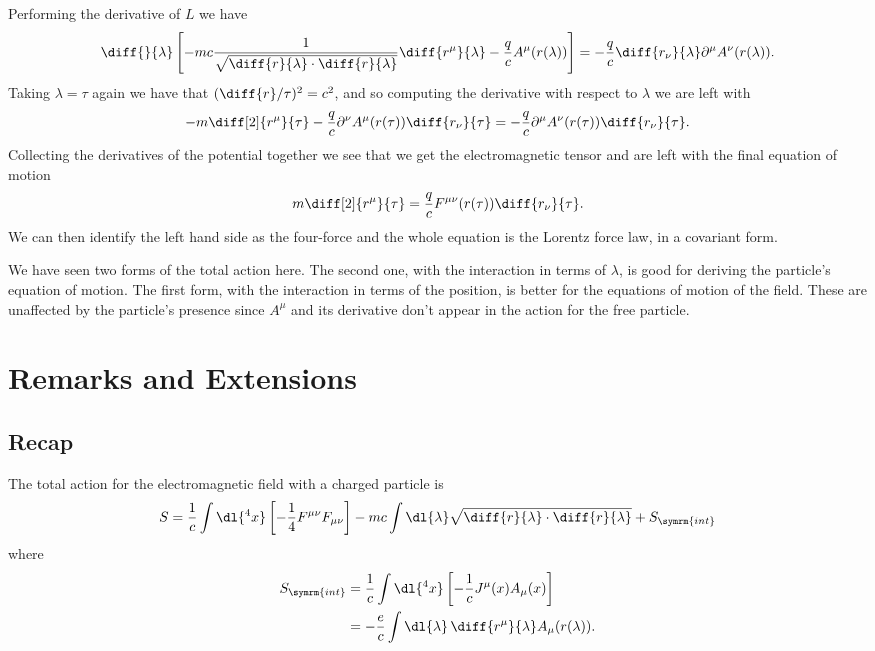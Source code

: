 \documentclass[fleqn]{NotesClass}
\newcommand*{\lagrangian}{L}
\begin{document}
    Performing the derivative of \(\lagrangian\) we have
    \begin{equation}
        \diff{}{\lambda} \left[ -mc \frac{1}{\sqrt{\diff{r}{\lambda} \cdot \diff{r}{\lambda}}} \diff{r^\mu}{\lambda} - \frac{q}{c}A^\mu(r(\lambda)) \right] = -\frac{q}{c} \diff{r_\nu}{\lambda} \partial^\mu A^\nu(r(\lambda)).
    \end{equation}
    Taking \(\lambda = \tau\) again we have that \((\diff{r}/{\tau})^2 = c^2\), and so computing the derivative with respect to \(\lambda\) we are left with
    \begin{equation}
        -m\diff[2]{r^\mu}{\tau} - \frac{q}{c}\partial^\nu A^\mu(r(\tau)) \diff{r_\nu}{\tau} = -\frac{q}{c}\partial^\mu A^\nu(r(\tau)) \diff{r_\nu}{\tau}.
    \end{equation}
    Collecting the derivatives of the potential together we see that we get the electromagnetic tensor and are left with the final equation of motion
    \begin{equation}
        m \diff[2]{r^\mu}{\tau} = \frac{q}{c}F^{\mu\nu}(r(\tau)) \diff{r_\nu}{\tau}.
    \end{equation}
    We can then identify the left hand side as the four-force and the whole equation is the Lorentz force law, in a covariant form.
    
    We have seen two forms of the total action here.
    The second one, with the interaction in terms of \(\lambda\), is good for deriving the particle's equation of motion.
    The first form, with the interaction in terms of the position, is better for the equations of motion of the field.
    These are unaffected by the particle's presence since \(A^\mu\) and its derivative don't appear in the action for the free particle.
    
    \chapter{Remarks and Extensions}
    \section{Recap}
    The total action for the electromagnetic field with a charged particle is
    \begin{equation}
        S = \frac{1}{c} \int\dl{^4x} \left[ -\frac{1}{4} F^{\mu\nu}F_{\mu\nu} \right] - mc \int \dl{\lambda} \sqrt{\diff{r}{\lambda} \cdot \diff{r}{\lambda}} + S_{\symrm{int}}
    \end{equation}
    where
    \begin{align}
        S_{\symrm{int}} &= \frac{1}{c} \int \dl{^4x} \left[ -\frac{1}{c}J^\mu(x)A_\mu(x) \right]\\
        &= -\frac{e}{c} \int \dl{\lambda} \, \diff{r^\mu}{\lambda} A_\mu(r(\lambda)).
    \end{align}
    
\end{document}
